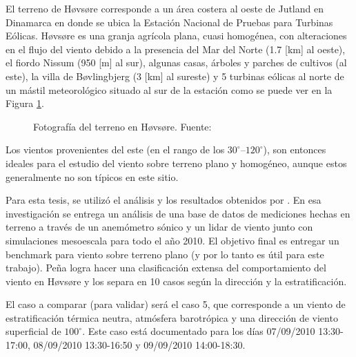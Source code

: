  El terreno de Høvsøre corresponde a un área costera al oeste de Jutland en Dinamarca en donde se ubica la Estación Nacional de Pruebas para Turbinas Eólicas. Høvsøre es una granja agrícola plana, cuasi homogénea, con alteraciones en el flujo del viento debido a la presencia del Mar del Norte (1.7 [km] al oeste), el fiordo Nissum (950 [m] al sur), algunas casas, árboles y parches de cultivos (al este), la villa de Bøvlingbjerg (3 [km] al sureste) y 5 turbinas eólicas al norte de un mástil meteorológico situado al sur de la estación como se puede ver en la Figura \ref{fig:05_terreno_hovsore}.
 
 \begin{figure}[H]
 	\centering{}%
 	\caption{Fotografía del terreno en Høvsøre. Fuente: \cite{Pea2013}}
 	\label{fig:05_terreno_hovsore}
 \end{figure}
 
 Los vientos provenientes del este (en el rango de los $30^\circ$--$120^\circ$), son entonces ideales para el estudio del viento sobre terreno plano y homogéneo, aunque estos generalmente no son típicos en este sitio.
 
 Para esta tesis, se utilizó el análisis y los resultados obtenidos por \cite{Pea2013}. En esa investigación se entrega un análisis de una base de datos de mediciones hechas en terreno a través de un anemómetro sónico y un lidar de viento junto con simulaciones mesoescala para todo el año 2010. El objetivo final es entregar un benchmark para viento sobre terreno plano (y por lo tanto es útil para este trabajo). Peña logra hacer una clasificación extensa del comportamiento del viento en Høvsøre y los separa en 10 casos según la dirección y la estratificación.
 
 El caso a comparar (para validar) será el caso 5, que corresponde a un viento de estratificación térmica neutra, atmósfera barotrópica y una dirección de viento superficial de $100^\circ$. Este caso está documentado para los días 07/09/2010 13:30-17:00, 08/09/2010 13:30-16:50 y 09/09/2010 14:00-18:30. 

